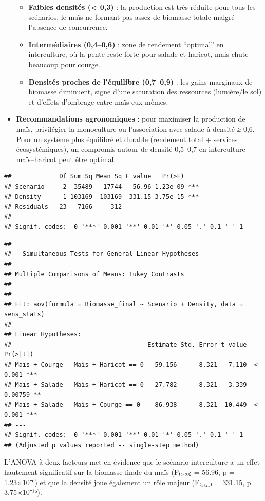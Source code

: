 \documentclass[
]{article}
\begin{document}
\begin{itemize}
  \begin{itemize}
  \item
    \textbf{Faibles densités (\textless{} 0,3)} : la production est très
    réduite pour tous les scénarios, le maïs ne formant pas assez de
    biomasse totale malgré l'absence de concurrence.
  \item
    \textbf{Intermédiaires (0,4--0,6)} : zone de rendement ``optimal''
    en interculture, où la pente reste forte pour salade et haricot,
    mais chute beaucoup pour courge.
  \item
    \textbf{Densités proches de l'équilibre (0,7--0,9)} : les gains
    marginaux de biomasse diminuent, signe d'une saturation des
    ressources (lumière/le sol) et d'effets d'ombrage entre maïs
    eux-mêmes.
  \end{itemize}
\item
  \textbf{Recommandations agronomiques} : pour maximiser la production
  de maïs, privilégier la monoculture ou l'association avec salade à
  densité ≥ 0,6. Pour un système plus équilibré et durable (rendement
  total + services écosystémiques), un compromis autour de densité
  0,5--0,7 en interculture maïs--haricot peut être optimal.
\end{itemize}

\begin{verbatim}
##             Df Sum Sq Mean Sq F value   Pr(>F)    
## Scenario     2  35489   17744   56.96 1.23e-09 ***
## Density      1 103169  103169  331.15 3.75e-15 ***
## Residuals   23   7166     312                     
## ---
## Signif. codes:  0 '***' 0.001 '**' 0.01 '*' 0.05 '.' 0.1 ' ' 1
\end{verbatim}

\begin{verbatim}
## 
##   Simultaneous Tests for General Linear Hypotheses
## 
## Multiple Comparisons of Means: Tukey Contrasts
## 
## 
## Fit: aov(formula = Biomasse_final ~ Scenario + Density, data = sens_stats)
## 
## Linear Hypotheses:
##                                     Estimate Std. Error t value Pr(>|t|)    
## Maïs + Courge - Maïs + Haricot == 0  -59.156      8.321  -7.110  < 0.001 ***
## Maïs + Salade - Maïs + Haricot == 0   27.782      8.321   3.339  0.00759 ** 
## Maïs + Salade - Maïs + Courge == 0    86.938      8.321  10.449  < 0.001 ***
## ---
## Signif. codes:  0 '***' 0.001 '**' 0.01 '*' 0.05 '.' 0.1 ' ' 1
## (Adjusted p values reported -- single-step method)
\end{verbatim}

L'ANOVA à deux facteurs met en évidence que le scénario interculture a
un effet hautement significatif sur la biomasse finale du maïs (F₍₂,₂₃₎
= 56.96, p = 1.23×10⁻⁹) et que la densité joue également un rôle majeur
(F₍₁,₂₃₎ = 331.15, p = 3.75×10⁻¹⁵).
\end{document}
